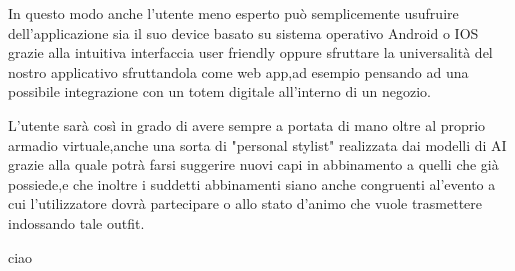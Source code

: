 \documentclass[a4paper,oneside]{Tptesi2}
\begin{document}
In questo modo anche l'utente meno esperto può semplicemente usufruire dell'applicazione sia il suo device basato su sistema operativo Android o IOS grazie alla intuitiva interfaccia user friendly oppure sfruttare la universalità del nostro applicativo sfruttandola come web app,ad esempio pensando ad una possibile integrazione con un totem digitale all'interno di un negozio.

L'utente sarà così in grado di avere sempre a portata di mano oltre al proprio armadio virtuale,anche una sorta di "personal stylist" realizzata dai modelli di AI grazie alla quale potrà farsi suggerire nuovi capi in abbinamento a quelli che già possiede,e che inoltre i suddetti abbinamenti siano anche congruenti al'evento a cui l'utilizzatore dovrà partecipare o allo stato d'animo che vuole trasmettere indossando tale outfit.

\mainmatter

ciao
% 





%
\end{document}

